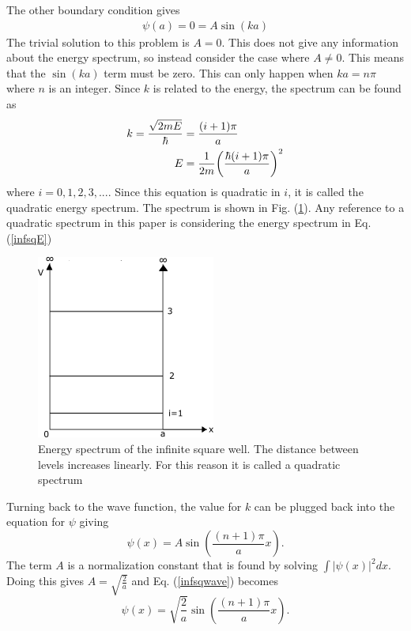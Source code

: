 The other boundary condition gives
\begin{align}
    \psi(a)=0=A\sin(ka)
\end{align}
The trivial solution to this problem is $A=0$. This does not give any information about the energy spectrum, so instead consider the case where $A\neq 0$. This means that the $\sin(ka)$ term must be zero. This can only happen when $ka=n\pi$ where $n$ is an integer. Since $k$ is related to the energy, the spectrum can be found as
\begin{align}
    k=\frac{\sqrt{2mE}}{\hbar}&=\frac{(i+1)\pi}{a}\\
    E&=\frac{1}{2m} \qty(\frac{\hbar (i+1)\pi}{a})^2 \label{infsqE}
\end{align}
where $i=0,1,2,3,...$. Since this equation is quadratic in $i$, it is called the quadratic energy spectrum. The spectrum is shown in Fig. (\ref{fig:Energy spectrum of the infinite square well}). Any reference to a quadratic spectrum in this paper is considering the energy spectrum in Eq.\@ (\ref{infsqE})
\begin{figure}[H]
    \centering
    \includegraphics[scale=1.0]{figures/pdf/sqwellspec.png}
    \caption{Energy spectrum of the infinite square well. The distance between levels increases linearly. For this reason it is called a quadratic spectrum}
    \label{fig:Energy spectrum of the infinite square well}
\end{figure}
Turning back to the wave function, the value for $k$ can be plugged back into the equation for $\psi$ giving
\begin{equation}
    \psi(x)=A\sin(\frac{(n+1)\pi}{a}x). \label{infsqwave}
\end{equation}
The term $A$ is a normalization constant that is found by solving $\int|\psi(x)|^2 dx$. Doing this gives $A=\sqrt{\frac{2}{a}}$ and Eq. (\ref{infsqwave}) becomes 
\begin{equation}
    \psi(x)=\sqrt{\frac{2}{a}}\sin(\frac{(n+1)\pi}{a}x).
\end{equation}